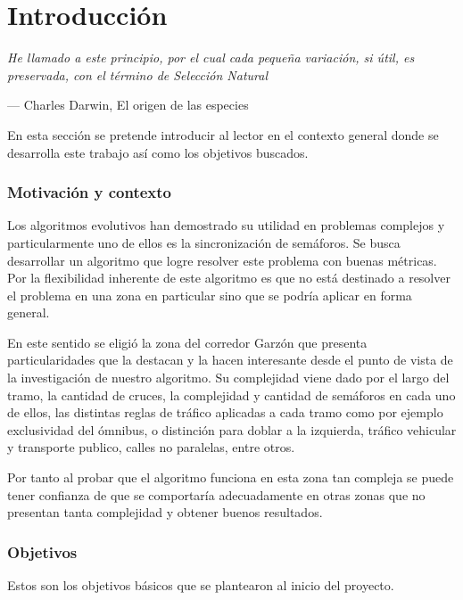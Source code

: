 \chapter{Introducción}
\epigraph{ \textit{He llamado a este principio, por el cual cada pequeña variación, si útil, es preservada, con el término de Selección Natural}}{--- Charles Darwin, El origen de las especies}

En esta sección se pretende introducir al lector en el contexto general donde se desarrolla este trabajo así como los objetivos buscados.

\subsection{Motivación y contexto}

Los algoritmos evolutivos han demostrado su utilidad en problemas complejos y particularmente uno de ellos es la sincronización de semáforos. Se busca desarrollar un algoritmo que logre resolver este problema con buenas métricas.
Por la flexibilidad inherente de este algoritmo es que no está destinado a resolver el problema en una zona en particular sino que se podría aplicar en forma general.

En este sentido se eligió la zona del corredor Garzón que presenta particularidades que la destacan y la hacen interesante desde el punto de vista de la investigación de nuestro algoritmo. Su complejidad viene dado por el largo del tramo, la cantidad de cruces, la complejidad y cantidad de semáforos en cada uno de ellos, las distintas reglas de tráfico aplicadas a cada tramo como por ejemplo exclusividad del ómnibus, o distinción para doblar a la izquierda, tráfico vehicular y transporte publico, calles no paralelas, entre otros.

Por tanto al probar que el algoritmo funciona en esta zona tan compleja se puede tener confianza de que se comportaría adecuadamente en otras zonas que no presentan tanta complejidad y obtener buenos resultados.



\newpage

\subsection{Objetivos}

Estos son los objetivos básicos que se plantearon al inicio del  proyecto.

